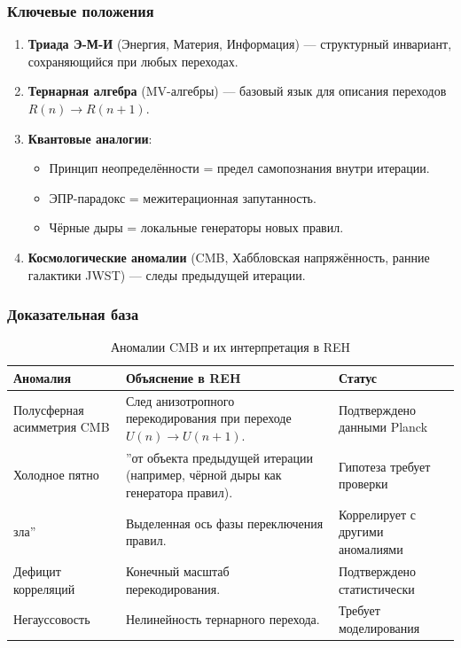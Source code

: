 \documentclass[11pt, a4paper]{article}
\begin{document}
\subsubsection*{Ключевые положения}
\begin{enumerate}
    \item \textbf{Триада Э-М-И} (Энергия, Материя, Информация) --- структурный инвариант, сохраняющийся при любых переходах.
    \item \textbf{Тернарная алгебра} (MV-алгебры) --- базовый язык для описания переходов $R(n) \rightarrow R(n+1)$.
    \item \textbf{Квантовые аналогии}:
    \begin{itemize}
        \item Принцип неопределённости = предел самопознания внутри итерации.
        \item ЭПР-парадокс = межитерационная запутанность.
        \item Чёрные дыры = локальные генераторы новых правил.
    \end{itemize}
    \item \textbf{Космологические аномалии} (CMB, Хаббловская напряжённость, ранние галактики JWST) --- следы предыдущей итерации.
\end{enumerate}

\subsubsection*{Доказательная база}
\begin{table}[H]
\centering
\begin{tabular}{l l l}
\toprule
\textbf{Аномалия} & \textbf{Объяснение в REH} & \textbf{Статус} \\
\midrule
Полусферная асимметрия CMB & След анизотропного перекодирования при переходе $U(n) \rightarrow U(n+1)$. & Подтверждено данными Planck \\
Холодное пятно & \textquotedblright от объекта предыдущей итерации (например, чёрной дыры как генератора правил). & Гипотеза требует проверки \\
 зла\textquotedblright & Выделенная ось фазы переключения правил. & Коррелирует с другими аномалиями \\
Дефицит корреляций & Конечный масштаб перекодирования. & Подтверждено статистически \\
Негауссовость & Нелинейность тернарного перехода. & Требует моделирования \\
\bottomrule
\end{tabular}
\caption{Аномалии CMB и их интерпретация в REH}
\end{table}
\end{document}
